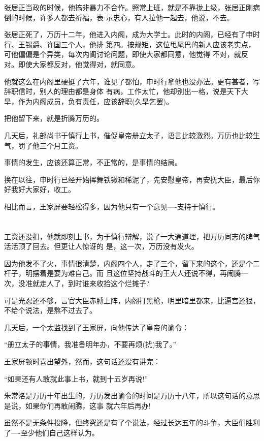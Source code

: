 \documentclass[11pt,a4paper,onecolumn]{article}
\begin{document}
张居正当政的时候，他搞非暴力不合作。照常上班，就是不靠拢上级，张居正刚病倒的时候，许多人都去祈福，表
示忠心，有人拉他一起去，他说，不去。

张居正死了，万历十二年，他进入内阁，成为大学士。此时的内阁，已经有了申时行、王锡爵、许国三个人，他排
第四。按规矩，这位甩尾巴的新人应该老实点，可他偏偏是个异类，每次内阁讨论问题，即使大家都同意，他觉得
不对，就反对。即使大家都反对，他觉得对，就同意。

他就这么在内阁里硬挺了六年，谁见了都怕，申时行拿他也没办法。更有甚者，写辞职信时，别人的理由都是身体
有病，工作太忙，他却别出一格，说是天下大旱，作为内阁成员，负有责任，应该辞职(久旱乞罢)。

把他留下来，就是折腾万历的。

几天后，礼部尚书于慎行上书，催促皇帝册立太子，语言比较激烈。万历也比较生气，罚了他三个月工资。

事情的发生，应该还算正常，不正常的，是事情的结局。

换在以往，申时行已经开始挥舞铁锹和稀泥了，先安慰皇帝，再安抚大臣，最后你好我好大家好，收工。

相比而言，王家屏要轻松得多，因为他只有一个意见----支持于慎行。

\section[\thesection]{}

工资还没扣，他就即刻上书，为于慎行辩解，说了一大通道理，把万历同志的脾气活活顶了回去。但更让人惊讶的
是，这一次，万历没有发火。

因为他发不了火，事情很清楚，内阁四个人，走了三个，留下来的这个，还是个二杆子，明摆着是要为难自己。而
且这位坚持战斗的王大人还说不得，再闹腾一次，没准就走人了，到时谁来收拾这个烂摊子?

可是光忍还不够，言官大臣赤膊上阵，内阁打黑枪，明里暗里都来，比逼宫还狠，不给个说法，是熬不过去了。

几天后，一个太监找到了王家屏，向他传达了皇帝的谕令：

``册立太子的事情，我准备明年办，不要再烦(扰)我了。''

王家屏顿时喜出望外，然而，这句话还没有讲完：

``如果还有人敢就此事上书，就到十五岁再说!''

朱常洛是万历十年出生的，万历发出谕令的时间是万历十八年，所以这句话的意思是说，如果你们再敢闹腾，这事
就六年后再办!

虽然不是无条件投降，但终究还是有了个说法，经过长达五年的斗争，大臣们胜利了----至少他们自己这样认为。
\end{document}
